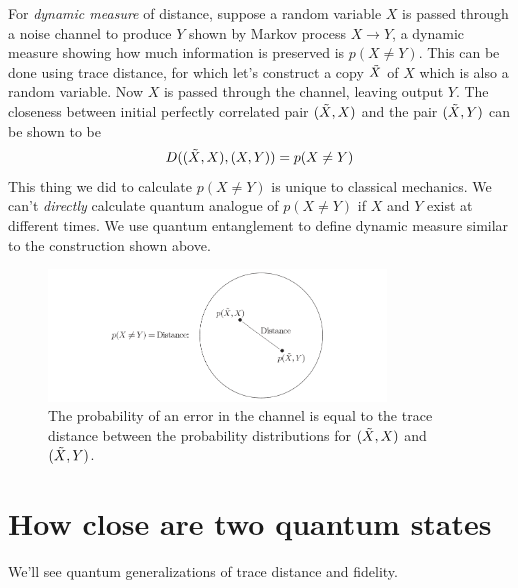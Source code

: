 For \textit{dynamic measure} of distance, suppose a random variable $X$ is passed through a noise channel to produce $Y$ shown by Markov process $X\longrightarrow Y$, a dynamic measure showing how much information is preserved is $p(X\neq Y)$. This can be done using trace distance, for which let's construct a copy $\Tilde{X}$ of $X$ which is also a random variable. Now $X$ is passed through the channel, leaving output $Y$. The closeness between initial perfectly correlated pair $(\Tilde{X}, X)$ and the pair $(\Tilde{X}, Y)$ can be shown to be
\begin{equation}
    D((\Tilde{X},X), (X, Y)) = p(X\neq Y)
    \label{eq:trace_distance_using_copy}
\end{equation}
This thing we did to calculate $p(X\neq Y)$ is unique to classical mechanics. We can't \textit{directly} calculate quantum analogue of $p(X\neq Y)$ if $X$ and $Y$ exist at different times. We use quantum entanglement to define dynamic measure similar to the construction shown above. 
\begin{figure}[H]
    \centering
    \includegraphics[width=0.8\textwidth]{images/dynamic_measure.png}
    \caption{The probability of an error in the channel is equal to the trace distance between the probability distributions for $( \Tilde{X}, X)$ and $( \Tilde{X}, Y )$.}
    \label{fig:enter-label}
\end{figure}

\section{How close are two quantum states}
We'll see quantum generalizations of trace distance and fidelity.
